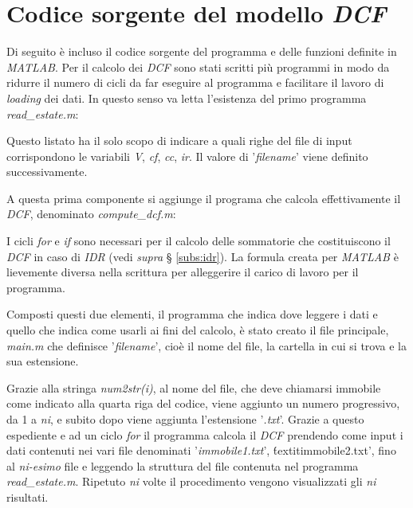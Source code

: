 \chapter{Codice sorgente del modello \textit{DCF}}
\label{app:listatomatlab}
Di seguito è incluso il codice sorgente del programma e delle funzioni definite in \textit{MATLAB}.
Per il calcolo dei \textit{DCF} sono stati scritti più programmi in modo da ridurre il numero di cicli da far eseguire al programma e facilitare il lavoro di \textit{loading} dei dati. 
In questo senso va letta l'esistenza del primo programma \textit{read\_estate.m}:


Questo listato ha il solo scopo di indicare a quali righe del file di input corrispondono le variabili \textit{V}, \textit{cf}, \textit{cc}, \textit{ir}. Il valore di '\textit{filename}' viene definito successivamente.

A questa prima componente si aggiunge il programa che calcola effettivamente il \textit{DCF}, denominato \textit{compute\_dcf.m}:



I cicli \textit{for} e \textit{if} sono necessari per il calcolo delle sommatorie che costituiscono il \textit{DCF} in caso di \textit{IDR} (vedi \textit{supra} § \ref{subs:idr}). La formula creata per \textit{MATLAB} è lievemente diversa nella scrittura per alleggerire il carico di lavoro per il programma.

Composti questi due elementi, il programma che indica dove leggere i dati e quello che indica come usarli ai fini del calcolo, è stato creato il file principale, \textit{main.m} che definisce '\textit{filename}', cioè il nome del file, la cartella in cui si trova e la sua estensione.



Grazie alla stringa \textit{num2str(i)}, al nome del file, che deve chiamarsi immobile come indicato alla quarta riga del codice, viene aggiunto un numero progressivo, da 1 a \textit{ni}, e subito dopo viene aggiunta l'estensione '\textit{.txt}'. 
Grazie a questo espediente e ad un ciclo \textit{for} il programma calcola il \textit{DCF} prendendo come input i dati contenuti nei vari file denominati '\textit{immobile1.txt}', \'textit{immobile2.txt}', fino al \textit{ni-esimo} file e leggendo la struttura del file contenuta nel programma \textit{read\_estate.m}.
Ripetuto \textit{ni} volte il procedimento vengono visualizzati gli \textit{ni} risultati.

